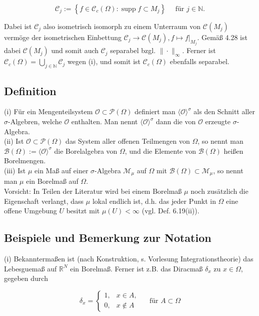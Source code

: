 \documentclass[10pt, letterpaper]{article}
\begin{document}
$$
\mathcal{C}_{j}:=\left\{f \in \mathcal{C}_{c}(\Omega): \operatorname{supp} f \subset M_{j}\right\} \quad \text { für } j \in \mathbb{N} .
$$

Dabei ist $\mathcal{C}_{j}$ also isometrisch isomorph zu einem Unterraum von $\mathcal{C}\left(M_{j}\right)$ vermöge der isometrischen Einbettung $\mathcal{C}_{j} \rightarrow \mathcal{C}\left(M_{j}\right),\left.f \mapsto f\right|_{M_{j}}$. Gemäß 4.28 ist dabei $\mathcal{C}\left(M_{j}\right)$ und somit auch $\mathcal{C}_{j}$ separabel bzgl. $\|\cdot\|_{\infty}$. Ferner ist $\mathcal{C}_{c}(\Omega)=\bigcup_{j \in \mathbb{N}} \mathcal{C}_{j}$ wegen (i), und somit ist $\mathcal{C}_{c}(\Omega)$ ebenfalls separabel.

\subsection*{Definition}
(i) Für ein Mengenteilsystem $\mathcal{O} \subset \mathcal{P}(\Omega)$ definiert man $\langle\mathcal{O}\rangle^{\sigma}$ als den Schnitt aller $\sigma$-Algebren, welche $\mathcal{O}$ enthalten. Man nennt $\langle\mathcal{O}\rangle^{\sigma}$ dann die von $\mathcal{O}$ erzeugte $\sigma$-Algebra.\\
(ii) Ist $\mathcal{O} \subset \mathcal{P}(\Omega)$ das System aller offenen Teilmengen von $\Omega$, so nennt man $\mathcal{B}(\Omega):=\langle\mathcal{O}\rangle^{\sigma}$ die Borelalgebra von $\Omega$, und die Elemente von $\mathcal{B}(\Omega)$ heißen Borelmengen.\\
(iii) Ist $\mu$ ein Maß auf einer $\sigma$-Algebra $\mathcal{M}_{\mu}$ auf $\Omega$ mit $\mathcal{B}(\Omega) \subset \mathcal{M}_{\mu}$, so nennt man $\mu$ ein Borelmaß auf $\Omega$.\\
Vorsicht: In Teilen der Literatur wird bei einem Borelmaß $\mu$ noch zusätzlich die Eigenschaft verlangt, dass $\mu$ lokal endlich ist, d.h. das jeder Punkt in $\Omega$ eine offene Umgebung $U$ besitzt mit $\mu(U)<\infty$ (vgl. Def. 6.19(ii)).

\subsection*{Beispiele und Bemerkung zur Notation}
(i) Bekanntermaßen ist (nach Konstruktion, s. Vorlesung Integrationstheorie) das Lebesguemaß auf $\mathbb{R}^{N}$ ein Borelmaß. Ferner ist z.B. das Diracmaß $\delta_{x}$ zu $x \in \Omega$, gegeben durch

$$
\delta_{x}=\left\{\begin{array}{ll}
1, & x \in A, \\
0, & x \notin A
\end{array} \quad \text { für } A \subset \Omega\right.
$$
\end{document}
